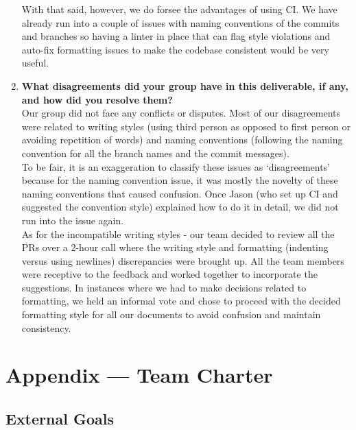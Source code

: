 \documentclass{article}
\begin{document}
\begin{enumerate}
    \newline
    With that said, however, we do forsee the advantages of using CI. We have already run into a
    couple of issues with naming conventions of the commits and branches so having a linter in place that can
    flag style violations and auto-fix formatting issues to make the codebase consistent would be very useful.
    \item \textbf{What disagreements did your group have in this deliverable, if any,
    and how did you resolve them?}\\
    \newline
    Our group did not face any conflicts or disputes. Most of our disagreements were related to writing styles
    (using third person as opposed to first person or avoiding repetition of words) and naming conventions (following
    the naming convention for all the branch names and the commit messages).\\
    \newline
    To be fair, it is an exaggeration to classify these issues as `disagreements' because for the naming convention 
    issue, it was mostly the novelty of these naming conventions that caused confusion. Once Jason (who set up CI and
    suggested the convention style) explained how to do it in detail, we did not run into the issue again.\\
    \newline
    As for the incompatible writing styles -  our team decided to review all the PRs over a 2-hour call where the writing
    style and formatting (indenting versus using newlines) discrepancies were brought up. All the team members were
    receptive to the feedback and worked together to incorporate the suggestions. In instances where we had to make
    decisions related to formatting, we held an informal vote and chose to proceed with the decided formatting style
    for all our documents to avoid confusion and maintain consistency.
\end{enumerate}

\newpage{}

\section*{Appendix --- Team Charter \cite{ref1}}

\subsection*{External Goals}
\end{document}
